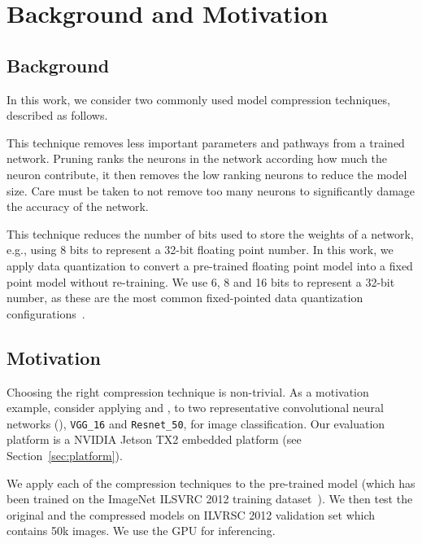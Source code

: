 
\section{Background and Motivation}
\subsection{Background}
In this work, we consider two commonly used model compression techniques, described as follows.

 This technique removes less important parameters and pathways from a trained network. Pruning ranks the neurons in
the network according how much the neuron contribute, it then removes the low ranking neurons to reduce the model size. Care must be taken
to not remove too many neurons to significantly damage the accuracy of the network.

 This technique reduces the number of bits used to store the weights of a network, e.g., using 8 bits to
represent a 32-bit floating point number. In this work, we apply data quantization to convert a pre-trained floating point model into a
fixed point model without re-training. We use 6, 8 and 16 bits to represent a 32-bit number, as these are the most common fixed-pointed
data quantization configurations~\cite{pacq}.



\subsection{Motivation}
Choosing the right compression technique is non-trivial. As a motivation example, consider applying \pruning and \dquantization, to two
representative convolutional neural networks (\CNN), \texttt{VGG\_16} 	and \texttt{Resnet\_50}, for image classification. Our evaluation
platform is a NVIDIA Jetson TX2 embedded platform (see Section~\ref{sec:platform}).

 We apply each of the compression techniques to the pre-trained model (which has been trained on the ImageNet ILSVRC
2012 training dataset~\cite{imagenet2012}). We then test the original and the compressed models on ILVRSC 2012 validation set which
contains 50k images. We use the GPU for inferencing.

